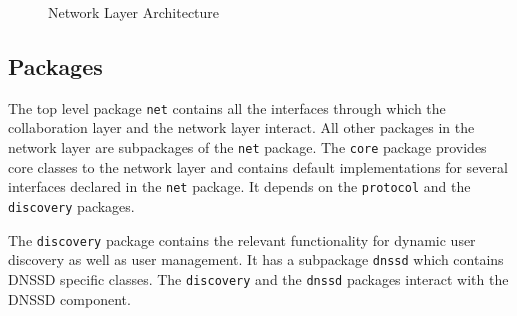 \begin{figure}[H]
 \centering
 \caption{Network Layer Architecture}
 \label{fig:network.architecture}
\end{figure}


\subsection{Packages}

The top level package \texttt{net} contains all the interfaces through which the collaboration layer and the network layer interact. All other packages in the network layer are subpackages of the \texttt{net} package. The \texttt{core} package provides core classes to the network layer and contains default implementations for several interfaces declared in the \texttt{net} package. It depends on the \texttt{protocol} and the \texttt{discovery} packages.

The \texttt{discovery} package contains the relevant functionality for dynamic user discovery as well as user management. It has a subpackage \texttt{dnssd} which contains DNSSD specific classes. The \texttt{discovery} and the \texttt{dnssd} packages interact with the DNSSD component.

